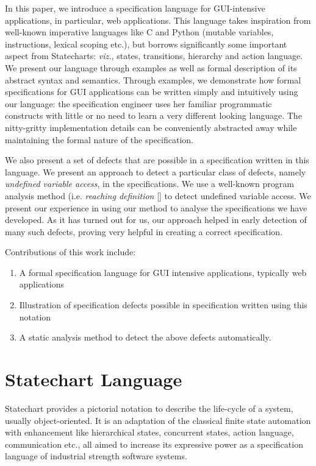 \documentclass[12pt,a4paper]{report}
\begin{document}
In this paper, we introduce a specification language for GUI-intensive applications, in particular, web applications. This language takes inspiration from well-known imperative languages like C and Python (mutable variables, instructions, lexical scoping etc.), but borrows significantly some important aspect from Statecharts: \emph{viz.}, states, transitions, hierarchy and action language. We present our language through examples as well as  formal description of its abstract syntax and semantics. Through examples, we demonstrate how formal specifications for GUI applications can be written simply and intuitively using our language: the specification engineer uses her familiar programmatic constructs with little or no need to learn a very different looking language. The nitty-gritty implementation details can be conveniently abstracted away while maintaining the formal nature of the specification.

We also present a set of defects that are possible in a specification written in this language. We present an approach to detect a particular class of defects, namely \emph{undefined variable access}, in the specifications. We use a well-known program analysis method (i.e. \emph{reaching definition} [] to detect undefined variable access. We present our experience in using our method to analyse the specifications we have developed. As it has turned out for us, our approach helped in early detection of many such defects, proving very helpful in creating a correct specification.

Contributions of this work include:
\begin{enumerate}
	\item A formal specification language for GUI intensive applications, typically web applications
	\item Illustration of specification defects possible in specification written using this notation
	\item A static analysis method to detect the above defects automatically.
\end{enumerate}

\section{Statechart Language}
Statechart provides a pictorial notation to describe the life-cycle of a system, usually object-oriented. It is an adaptation of the classical finite state automation with enhancement like hierarchical states, concurrent states, action language, communication etc., all aimed to increase its expressive power as a specification language of industrial strength software systems. 
\end{document}
